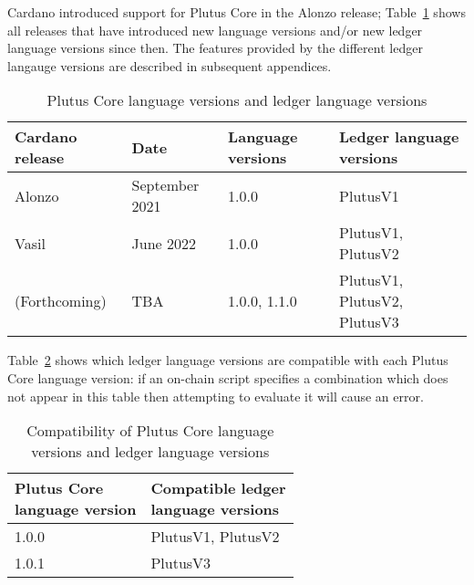 Cardano introduced support for Plutus Core in the Alonzo release;
Table~\ref{table:versions} shows all releases that have introduced new language
versions and/or new ledger language versions since then.  The features provided
by the different ledger langauge versions are described in subsequent appendices.
\begin{table}[H]
  \centering
    \begin{tabular}{|l|l|l|l|}
        \hline
        Cardano release & Date & Language versions & Ledger language versions \\
        \hline
        Alonzo & September 2021 & 1.0.0 & PlutusV1 \\
        Vasil & June 2022 & 1.0.0 & PlutusV1, PlutusV2 \\
        (Forthcoming) & TBA & 1.0.0, 1.1.0 & PlutusV1, PlutusV2, PlutusV3 \\
        \hline
    \end{tabular}
    \caption{Plutus Core language versions and ledger language versions}
    \label{table:versions}
\end{table}
   

\noindent Table~\ref{table:version-dependencies} shows which ledger language
versions are compatible with each Plutus Core language version: if an on-chain
script specifies a combination which does not appear in this table then
attempting to evaluate it will cause an error.
 
\begin{table}[H]
  \centering
    \begin{tabular}{|l|l|}
        \hline
        \thead{Plutus Core \\ language version} & \thead{Compatible ledger \\ language versions}\\
        \hline
        1.0.0 & PlutusV1, PlutusV2\\
        1.0.1 & PlutusV3 \\
        \hline
    \end{tabular}
    \caption{Compatibility of Plutus Core language versions and ledger language versions}
    \label{table:version-dependencies}
\end{table}

